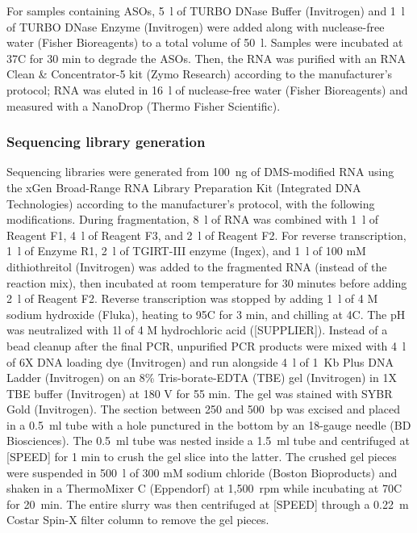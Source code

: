 \documentclass[main.tex]{subfiles}
\begin{document}
For samples containing ASOs, 5~\textmu l of TURBO DNase Buffer (Invitrogen) and 1~\textmu l of TURBO DNase Enzyme (Invitrogen) were added along with nuclease-free water (Fisher Bioreagents) to a total volume of 50~\textmu l.
Samples were incubated at 37\textdegree C for 30 min to degrade the ASOs.
Then, the RNA was purified with an RNA Clean \& Concentrator-5 kit (Zymo Research) according to the manufacturer's protocol; RNA was eluted in 16~\textmu l of nuclease-free water (Fisher Bioreagents) and measured with a NanoDrop (Thermo Fisher Scientific).

\subsubsection{Sequencing library generation}

Sequencing libraries were generated from 100~ng of DMS-modified RNA using the xGen Broad-Range RNA Library Preparation Kit (Integrated DNA Technologies) according to the manufacturer’s protocol, with the following modifications.
During fragmentation, 8~\textmu l of RNA was combined with 1~\textmu l of Reagent F1, 4~\textmu l of Reagent F3, and 2~\textmu l of Reagent F2. 
For reverse transcription, 1~\textmu l of Enzyme R1, 2~\textmu l of TGIRT-III enzyme (Ingex), and 1~\textmu l of 100 mM dithiothreitol (Invitrogen) was added to the fragmented RNA (instead of the reaction mix), then incubated at room temperature for 30 minutes before adding 2~\textmu l of Reagent F2.
Reverse transcription was stopped by adding 1~\textmu l of 4 M sodium hydroxide (Fluka), heating to 95\textdegree C for 3 min, and chilling at 4\textdegree C.
The pH was neutralized with 1\textmu l of 4 M hydrochloric acid ([SUPPLIER]).
Instead of a bead cleanup after the final PCR, unpurified PCR products were mixed with 4~\textmu l of 6X DNA loading dye (Invitrogen) and run alongside 4~\textmu l of 1~Kb Plus DNA Ladder (Invitrogen) on an 8\% Tris-borate-EDTA (TBE) gel (Invitrogen) in 1X TBE buffer (Invitrogen) at 180 V for 55 min.
The gel was stained with SYBR Gold (Invitrogen).
The section between 250 and 500~bp was excised and placed in a 0.5~ml tube with a hole punctured in the bottom by an 18-gauge needle (BD Biosciences).
The 0.5~ml tube was nested inside a 1.5~ml tube and centrifuged at [SPEED] for 1 min to crush the gel slice into the latter.
The crushed gel pieces were suspended in 500~\textmu l of 300 mM sodium chloride (Boston Bioproducts) and shaken in a ThermoMixer C (Eppendorf) at 1,500~rpm while incubating at 70\textdegree C for 20~min.
The entire slurry was then centrifuged at [SPEED] through a 0.22~\textmu m Costar Spin-X filter column to remove the gel pieces.
\end{document}
